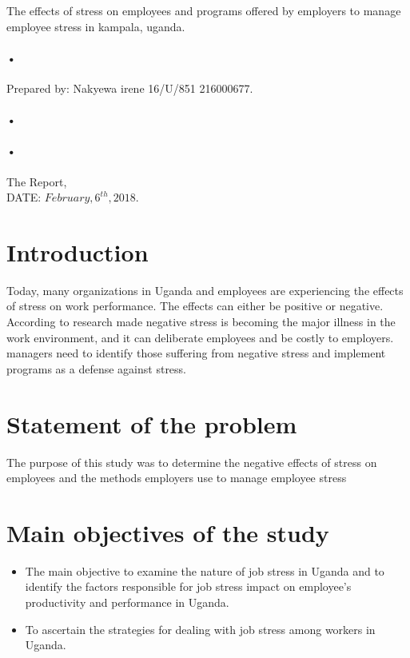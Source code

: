 \documentclass[10pt,]{article}
\begin{document}
\begin{titlepage}
\centerline{The effects of stress on employees and programs offered by employers to manage employee stress in kampala, uganda.\\}
\paragraph*{•}
\centerline{  Prepared by:  Nakyewa irene 16/U/851 216000677.\\}
\paragraph*{•}
\paragraph*{•}
  \begin{flushright}
  The Report,\\
  DATE: $February,6^{th},2018$.
 \tableofcontents

  \end{flushright}
\date{\today}
\end{titlepage}

\newpage



\section{Introduction}
Today, many organizations in Uganda and employees are experiencing the effects of stress on work performance. The effects can either be positive or negative. According to research made negative stress is becoming the major illness in the work environment, and it can deliberate employees and be costly to employers. managers need to identify those suffering from negative stress and implement programs as a defense against stress.

\section{Statement of the problem}
The purpose of this study was to determine the negative effects of stress on employees and the methods employers use to manage employee stress

\section{Main objectives of the study}
\begin{itemize}
\item The main objective to examine the nature of job stress in Uganda and to identify the factors responsible for job stress impact on employee’s productivity and performance in Uganda.
\item To ascertain the strategies for dealing with job stress among workers in Uganda.
\end{itemize}
\end{document}
